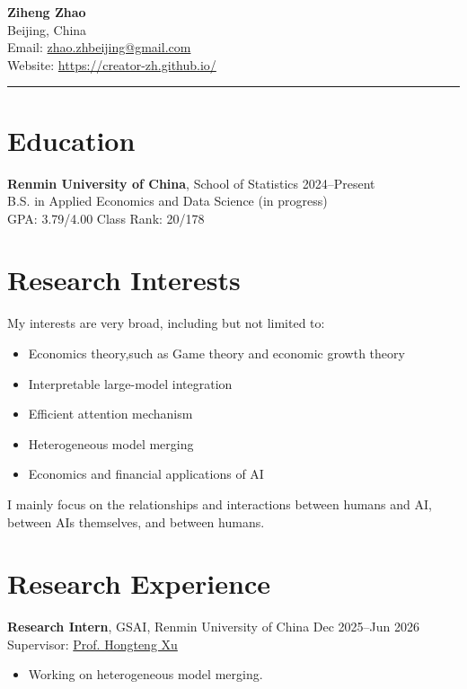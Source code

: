 \documentclass[11pt,a4paper]{article}
\begin{document}
{\LARGE \textbf{Ziheng Zhao}}\\[4pt]
Beijing, China \\
Email: \href{mailto:zhao.zhbeijing@gmail.com}{zhao.zhbeijing@gmail.com} \\
Website: \href{https://creator-zh.github.io/}{https://creator-zh.github.io/} \\

\vspace{10pt}
\hrule
\vspace{8pt}

\section*{Education}
\textbf{Renmin University of China}, School of Statistics \hfill 2024--Present \\
B.S. in Applied Economics and Data Science (in progress) \\
GPA: 3.79/4.00 \quad Class Rank: 20/178

\section*{Research Interests}
My interests are very broad, including but not limited to:  
\begin{itemize}
  \item Economics theory,such as Game theory and economic growth theory
  \item Interpretable large-model integration
  \item Efficient attention mechanism
  \item Heterogeneous model merging
  \item Economics and financial applications of AI
\end{itemize}
I mainly focus on the relationships and interactions between humans and AI, between AIs themselves, and between humans.

\section*{Research Experience}
\textbf{Research Intern}, GSAI, Renmin University of China \hfill Dec 2025--Jun 2026 \\
Supervisor: \href{https://hongtengxu.github.io/}{Prof. Hongteng Xu}
\begin{itemize}
  \item Working on heterogeneous model merging.
\end{itemize}
\end{document}
